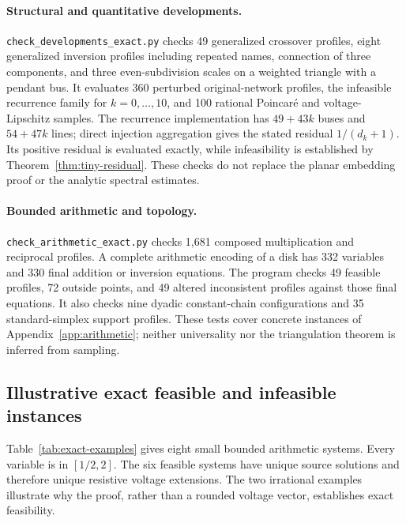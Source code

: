\paragraph{Structural and quantitative developments.}
\texttt{check\_developments\_exact.py} checks 49 generalized crossover
profiles, eight generalized inversion profiles including repeated names,
connection of three components, and three even-subdivision scales on a
weighted triangle with a pendant bus. It evaluates 360 perturbed
original-network profiles, the infeasible recurrence family for
$k=0,\ldots,10$, and 100 rational Poincar\'e and voltage-Lipschitz
samples. The recurrence implementation has $49+43k$ buses and
$54+47k$ lines; direct injection aggregation gives the
stated residual $1/(d_k+1)$. Its positive residual is evaluated exactly,
while infeasibility is established by Theorem~\ref{thm:tiny-residual}.
These checks do not replace the planar embedding proof or the analytic
spectral estimates.

\paragraph{Bounded arithmetic and topology.}
\texttt{check\_arithmetic\_exact.py} checks 1,681 composed multiplication
and reciprocal profiles. A complete arithmetic encoding of a disk has 332
variables and 330 final addition or inversion equations. The program checks
49 feasible profiles, 72 outside points, and 49 altered inconsistent profiles
against those final equations. It also checks nine dyadic constant-chain
configurations and 35 standard-simplex support profiles. These tests cover
concrete instances of Appendix~\ref{app:arithmetic}; neither universality nor
the triangulation theorem is inferred from sampling.

\subsection{Illustrative exact feasible and infeasible instances}

Table~\ref{tab:exact-examples} gives eight small bounded arithmetic systems.
Every variable is in $[1/2,2]$.
The six feasible systems have unique source solutions and therefore unique
resistive voltage extensions. The two irrational examples illustrate why
the proof, rather than a rounded voltage vector, establishes exact feasibility.

